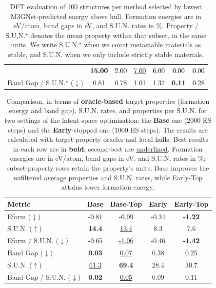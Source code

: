 \documentclass{article}
\theoremstyle{plain}
\theoremstyle{definition}
\theoremstyle{remark}
\begin{document}
\begin{table}[t]
{\begin{tabular}{l|cccc|cc}
        & \textcolor{black}{\textbf{15.00}}
        & \textcolor{black}{2.00}
        & \textcolor{black}{\underline{7.00}}
        & \textcolor{black}{6.00}
        & \textcolor{black}{0.00}
        & \textcolor{black}{0.00} \\
        Band Gap / S.U.N.$^\star$ ($\downarrow$)
        & 0.81
        & 0.78
        & 1.01
        & 1.37
        & \textbf{0.11}
        & \underline{0.28} \\
        \bottomrule
    \end{tabular}
    \caption{\small
    DFT evaluation of 100 structures per method selected by lowest M3GNet-predicted energy above hull. Formation energies are in eV/atom, band gaps in eV, and S.U.N. rates in \%. Property / S.U.N.$^\star$ denotes the mean property within that subset, in the same units.
    We write S.U.N.$^\star$ when we count metastable materials as stable, and S.U.N. when we only include strictly stable materials.
    }
    \label{tab:dft}
    }
    \vspace{-10pt}
\end{table}


\begin{table}[t]
\centering
\caption{Comparison, in terms of \textbf{oracle-based} target properties (formation energy and band gap), S.U.N. rates, and properties per S.U.N. for two settings of the latent-space optimization: the \textbf{Base} one ($2000$ ES steps) and the \textbf{Early}-stopped one ($1000$ ES steps). The results are calculated with target property oracles and local hulls. 
Best results in each row are in \textbf{bold}; second-best are \underline{underlined}.
Formation energies are in eV/atom, band gaps in eV, and S.U.N. rates in \%; subset-property rows retain the property's units. Base improves the unfiltered average properties and S.U.N. rates, while Early-Top attains lower formation energy.}
\label{tab:oracle_base_vs_early}
{
\begin{tabular}{l|cc|cc}
\toprule
\textbf{Metric} & Base & Base-Top & Early & Early-Top \\
\midrule
Eform ($\downarrow$) 
    & -0.81 & \underline{-0.99} & -0.34 & \textbf{-1.22} \\
S.U.N. ($\uparrow$) 
    & \textbf{14.4} & \underline{13.4} & 8.3 & 7.6 \\
Eform / S.U.N. ($\downarrow$) 
    & -0.65 & \underline{-1.06} & -0.46 & \textbf{-1.42} \\
\midrule
Band Gap ($\downarrow$) 
    & \textbf{0.03} & \underline{0.07} & 0.38 & 0.25 \\
S.U.N. ($\uparrow$) 
    & \underline{61.3} & \textbf{69.4} & 28.4 & 30.7 \\
Band Gap / S.U.N. ($\downarrow$) 
    & \textbf{0.02} & \underline{0.05} & 0.09 & 0.11 \\
\bottomrule
\end{tabular}
}
\end{table}
\end{document}
